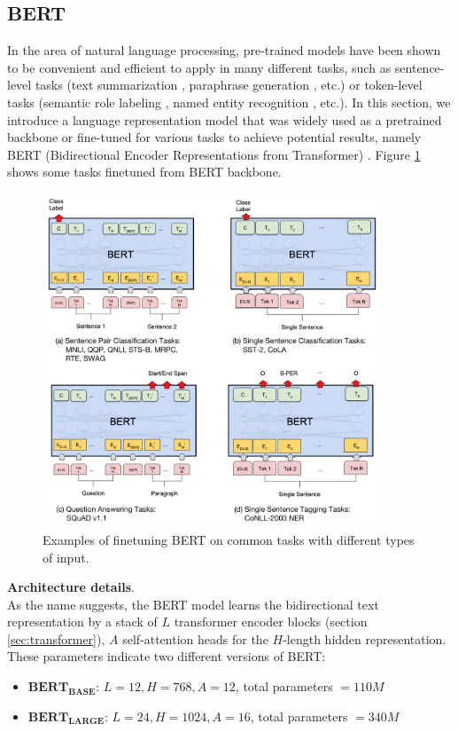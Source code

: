 \subsection{BERT}
\label{sec:BERT}
In the area of natural language processing, pre-trained models have been shown to be convenient and efficient to apply in many different tasks, such as sentence-level tasks (text summarization \cite{jadhav2018extractive, liu2018generative}, paraphrase generation \cite{wieting2017paranmt}, etc.) or token-level tasks (semantic role labeling \cite{he2018jointly,shi2019simple}, named entity recognition \cite{baevski2019cloze,strakova2019neural}, etc.). In this section, we introduce a language representation model that was widely used as a pretrained backbone or fine-tuned for various tasks to achieve potential results, namely BERT (Bidirectional Encoder Representations from Transformer) \cite{devlin2018bert}. Figure \ref{fig:BERT_finetune} shows some tasks finetuned from BERT backbone.
\begin{figure}[t!]
    \centering
    \includegraphics[width=0.9\textwidth]{resources/images/BERT_finetune.png}
    \caption{Examples of finetuning BERT on common tasks with different types of input. \cite{devlin2018bert}}
    \label{fig:BERT_finetune}
\end{figure}
\textbf{Architecture details}. \\
As the name suggests, the BERT model learns the bidirectional text representation by a stack of $L$ transformer encoder blocks (section \ref{sec:transformer}), $A$ self-attention heads for the $H$-length hidden representation. These parameters indicate two different versions of BERT: 
\begin{itemize}
    \item $\mathbf{BERT_{BASE}}$: $L = 12, H = 768, A = 12$, total parameters $= 110M$
    \item $\mathbf{BERT_{LARGE}}$: $L = 24, H = 1024, A = 16$, total parameters $= 340M$
\end{itemize}

